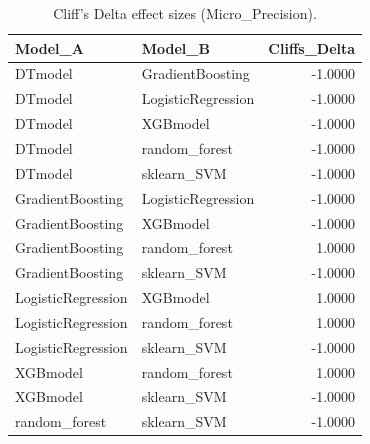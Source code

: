\begin{table}[t]
\centering
\begin{tabular}{llr}
\toprule
Model_A & Model_B & Cliffs_Delta \\
\midrule
DTmodel & GradientBoosting & -1.0000 \\
DTmodel & LogisticRegression & -1.0000 \\
DTmodel & XGBmodel & -1.0000 \\
DTmodel & random_forest & -1.0000 \\
DTmodel & sklearn_SVM & -1.0000 \\
GradientBoosting & LogisticRegression & -1.0000 \\
GradientBoosting & XGBmodel & -1.0000 \\
GradientBoosting & random_forest & 1.0000 \\
GradientBoosting & sklearn_SVM & -1.0000 \\
LogisticRegression & XGBmodel & 1.0000 \\
LogisticRegression & random_forest & 1.0000 \\
LogisticRegression & sklearn_SVM & -1.0000 \\
XGBmodel & random_forest & 1.0000 \\
XGBmodel & sklearn_SVM & -1.0000 \\
random_forest & sklearn_SVM & -1.0000 \\
\bottomrule
\end{tabular}
\caption{Cliff's Delta effect sizes (Micro_Precision).}
\label{tab:cliffs_Micro_Precision}
\end{table}